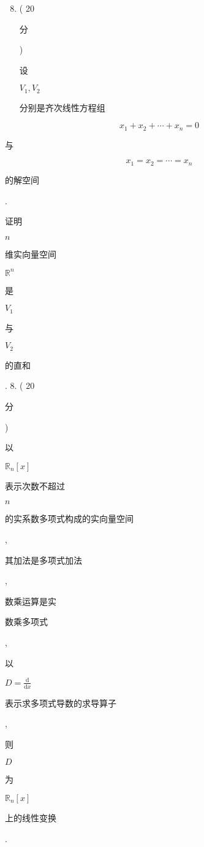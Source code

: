 \documentclass[10pt]{article}
\begin{document}
\begin{enumerate}
  \setcounter{enumi}{7}
  \item ( 20 \begin{CJK}{UTF8}{mj}分\end{CJK}) \begin{CJK}{UTF8}{mj}设\end{CJK} $V_{1}, V_{2}$ \begin{CJK}{UTF8}{mj}分别是齐次线性方程组\end{CJK}
\end{enumerate}
$$
x_{1}+x_{2}+\cdots+x_{n}=0
$$
\begin{CJK}{UTF8}{mj}与\end{CJK}
$$
x_{1}=x_{2}=\cdots=x_{n}
$$
\begin{CJK}{UTF8}{mj}的解空间\end{CJK}. \begin{CJK}{UTF8}{mj}证明\end{CJK} $n$ \begin{CJK}{UTF8}{mj}维实向量空间\end{CJK} $\mathbb{R}^{n}$ \begin{CJK}{UTF8}{mj}是\end{CJK} $V_{1}$ \begin{CJK}{UTF8}{mj}与\end{CJK} $V_{2}$ \begin{CJK}{UTF8}{mj}的直和\end{CJK}. 8. ( 20 \begin{CJK}{UTF8}{mj}分\end{CJK}) \begin{CJK}{UTF8}{mj}以\end{CJK} $\mathbb{R}_{n}[x]$ \begin{CJK}{UTF8}{mj}表示次数不超过\end{CJK} $n$ \begin{CJK}{UTF8}{mj}的实系数多项式构成的实向量空间\end{CJK}, \begin{CJK}{UTF8}{mj}其加法是多项式加法\end{CJK}, \begin{CJK}{UTF8}{mj}数乘运算是实\end{CJK} \begin{CJK}{UTF8}{mj}数乘多项式\end{CJK}, \begin{CJK}{UTF8}{mj}以\end{CJK} $D=\frac{\mathrm{d}}{\mathrm{d} x}$ \begin{CJK}{UTF8}{mj}表示求多项式导数的求导算子\end{CJK}, \begin{CJK}{UTF8}{mj}则\end{CJK} $D$ \begin{CJK}{UTF8}{mj}为\end{CJK} $\mathbb{R}_{n}[x]$ \begin{CJK}{UTF8}{mj}上的线性变换\end{CJK}.
\end{document}
